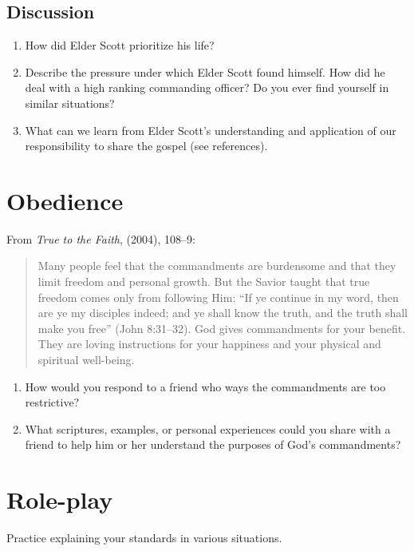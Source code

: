 \documentclass{article}
\begin{document}
\subsection*{Discussion}
\begin{enumerate}
  \item How did Elder Scott prioritize his life?
  \item Describe the pressure under which Elder Scott found himself. How did he deal with a high ranking commanding officer? Do you ever find yourself in similar situations?
  \item What can we learn from Elder Scott's understanding and application of our responsibility to share the gospel (see references).
\end{enumerate}

\section*{Obedience}
From \textit{True to the Faith}, (2004), 108--9:

\begin{quotation}
Many people feel that the commandments are burdensome and that they limit freedom and personal growth. But the Savior taught that true freedom comes only from following Him: ``If ye continue in my word, then are ye my disciples indeed; and ye shall know the truth, and the truth shall make you free'' (John 8:31--32). God gives commandments for your benefit. They are loving instructions for your happiness and your physical and spiritual well-being.
\end{quotation}

\begin{enumerate}
  \item How would you respond to a friend who ways the commandments are too restrictive?
  \item What scriptures, examples, or personal experiences could you share with a friend to help him or her understand the purposes of God's commandments?
\end{enumerate}

\section*{Role-play}
Practice explaining your standards in various situations.
\end{document}
